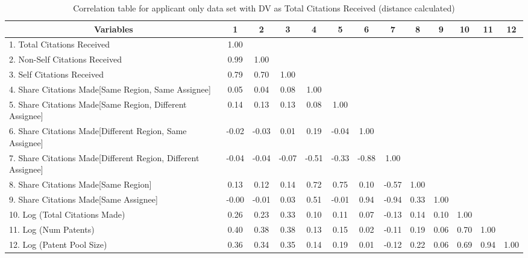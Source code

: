 \begin{table}[htbp]\centering \caption{Correlation table for applicant only data set with DV as Total Citations Received (distance calculated)\label{a.tcorrelation}}
\scriptsize
\singlespacing
\begin{adjustbox}{angle=90}
\begin{tabular}{l  c  c  c  c  c  c  c  c  c  c  c  c }\hline\hline
\multicolumn{1}{c}{Variables} &1&2&3&4&5&6&7&8&9&10&11&12\\ \hline
1. Total Citations Received&1.00\\
2. Non-Self Citations Received&0.99&1.00\\
3. Self Citations Received&0.79&0.70&1.00\\
4. Share Citations Made[Same Region, Same Assignee]&0.05&0.04&0.08&1.00\\
5. Share Citations Made[Same Region, Different Assignee]&0.14&0.13&0.13&0.08&1.00\\
6. Share Citations Made[Different Region, Same Assignee]&-0.02&-0.03&0.01&0.19&-0.04&1.00\\
7. Share Citations Made[Different Region, Different Assignee]&-0.04&-0.04&-0.07&-0.51&-0.33&-0.88&1.00\\
8. Share Citations Made[Same Region]&0.13&0.12&0.14&0.72&0.75&0.10&-0.57&1.00\\
9. Share Citations Made[Same Assignee]&-0.00&-0.01&0.03&0.51&-0.01&0.94&-0.94&0.33&1.00\\
10. Log (Total Citations Made)&0.26&0.23&0.33&0.10&0.11&0.07&-0.13&0.14&0.10&1.00\\
11. Log (Num Patents)&0.40&0.38&0.38&0.13&0.15&0.02&-0.11&0.19&0.06&0.70&1.00\\
12. Log (Patent Pool Size)&0.36&0.34&0.35&0.14&0.19&0.01&-0.12&0.22&0.06&0.69&0.94&1.00\\
\hline \hline 
 \end{tabular}
 \end{adjustbox}
\end{table}
